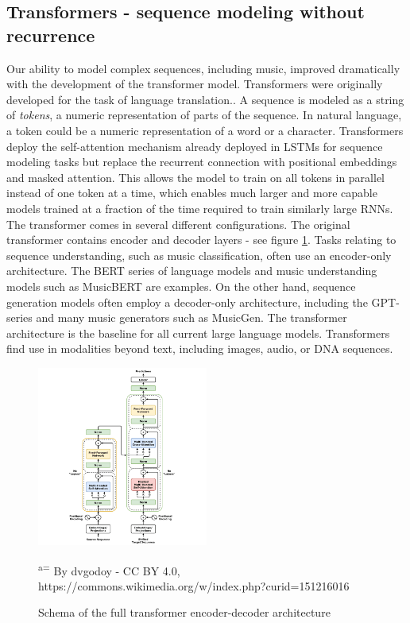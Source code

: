 \subsection{Transformers - sequence modeling without recurrence}
Our ability to model complex sequences, including music, improved dramatically with the development of the transformer model.  Transformers were originally developed for the task of language translation.\cite{Vaswani_Shazeer_Parmar_Uszkoreit_Jones_Gomez_Kaiser_Polosukhin_2017}. A sequence is modeled as a string of \textit{tokens}, a numeric representation of parts of the sequence. In natural language, a token could be a numeric representation of a word or a character. Transformers deploy the self-attention mechanism already deployed in LSTMs for sequence modeling tasks \cite{Sutskever_Vinyals_Le_2014} but replace the recurrent connection with positional embeddings and masked attention. This allows the model to train on all tokens in parallel instead of one token at a time, which enables much larger and more capable models trained at a fraction of the time required to train similarly large RNNs. The transformer comes in several different configurations. The original transformer contains encoder and decoder layers - see figure \ref{fig:transformer}. Tasks relating to sequence understanding, such as music classification, often use an encoder-only architecture. The BERT series of language models \cite{Devlin_Chang_Lee_ToutanovaBERT_2019} and music understanding models such as MusicBERT\cite{Zeng_Tan_Wang_MUSICBERT_2021} are examples. 
On the other hand, sequence generation models often employ a decoder-only architecture, including the GPT-series \cite{Radford_Wu_Child_Luan_gpt2_2019} and many music generators such as MusicGen\cite{copet2023simple}. The transformer architecture is the baseline for all current large language models. Transformers find use in modalities beyond text, including images, audio, or DNA sequences. 

\begin{figure}[H]
\centering
\includegraphics[width=0.5\textwidth]{IMAGES/Transformer,_full_architecture.png} 
\caption{Schema of the full transformer encoder-decoder architecture}
\small\textsuperscript{a=} By dvgodoy - CC BY 4.0, https://commons.wikimedia.org/w/index.php?curid=151216016
\label{fig:transformer}
\end{figure}


